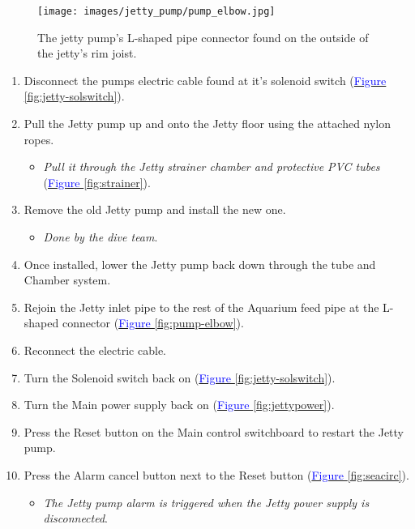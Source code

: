 \documentclass[
  12pt,
]{report}
\providecommand{\tightlist}{%
  \setlength{\itemsep}{0pt}\setlength{\parskip}{0pt}}\usepackage{longtable,booktabs,array}
\begin{document}
\begin{figure}[H]

{\centering \texttt{[image: images/jetty\_pump/pump\_elbow.jpg]}

}

\caption{The jetty pump's L-shaped pipe connector found on the outside
of the jetty's rim joist.}

\end{figure}

\begin{enumerate}
\def\labelenumi{\arabic{enumi}.}
\setcounter{enumi}{6}
\tightlist
\item
  Disconnect the pumps electric cable found at it's solenoid switch
  (\ul{\textcolor{blue}{Figure \ref{fig:jetty-solswitch}}}).
\item
  Pull the Jetty pump up and onto the Jetty floor using the attached
  nylon ropes.

  \begin{itemize}
  \tightlist
  \item
    \emph{Pull it through the Jetty strainer chamber and protective PVC
    tubes} (\ul{\textcolor{blue}{Figure \ref{fig:strainer}}}).
  \end{itemize}
\item
  Remove the old Jetty pump and install the new one.

  \begin{itemize}
  \tightlist
  \item
    \emph{Done by the dive team}.
  \end{itemize}
\item
  Once installed, lower the Jetty pump back down through the tube and
  Chamber system.
\item
  Rejoin the Jetty inlet pipe to the rest of the Aquarium feed pipe at
  the L-shaped connector
  (\ul{\textcolor{blue}{Figure \ref{fig:pump-elbow}}}).
\item
  Reconnect the electric cable.
\item
  Turn the Solenoid switch back on
  (\ul{\textcolor{blue}{Figure \ref{fig:jetty-solswitch}}}).
\item
  Turn the Main power supply back on
  (\ul{\textcolor{blue}{Figure \ref{fig:jettypower}}}).
\item
  Press the Reset button on the Main control switchboard to restart the
  Jetty pump.
\item
  Press the Alarm cancel button next to the Reset button
  (\ul{\textcolor{blue}{Figure \ref{fig:seacirc}}}).

  \begin{itemize}
  \tightlist
  \item
    \emph{The Jetty pump alarm is triggered when the Jetty power supply
    is disconnected}.
  \end{itemize}
\end{enumerate}
\end{document}
